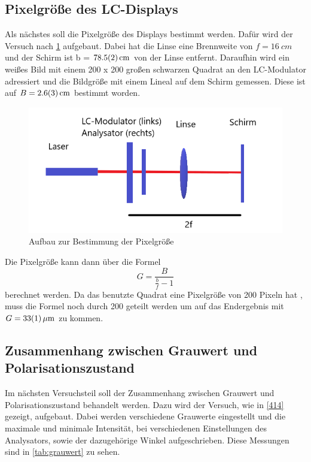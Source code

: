\subsection{Pixelgröße des LC-Displays}
Als nächstes soll die Pixelgröße des Displays bestimmt werden. Dafür wird der Versuch nach \cref{413} aufgebaut. Dabei hat die Linse eine Brennweite von $f = \SI{16}{cm}$ und der Schirm ist b = $\SI{78,5 \pm 0,2}{cm}$ von der Linse entfernt. Daraufhin wird ein weißes Bild mit einem 200 x 200 großen schwarzen Quadrat an den LC-Modulator adressiert und die Bildgröße mit einem Lineal auf dem Schirm gemessen. Diese ist auf $B = \SI{2,6 \pm 0,3}{cm}$
bestimmt worden.
\begin{figure}[h!]
	\centering
	\includegraphics[scale=1]{4.1.3-Aufbau.png}
	\caption{Aufbau zur Bestimmung der Pixelgröße}
	\label{413}
\end{figure}

Die Pixelgröße kann dann über die Formel
\begin{equation}
	G = \frac{B}{\frac{b}{f} - 1} 
\end{equation}
berechnet werden. Da das benutzte Quadrat eine Pixelgröße von 200 Pixeln hat , muss die Formel noch durch 200 geteilt werden um  auf das Endergebnis mit $G = \SI{33 \pm 1}{\mu m}$ zu kommen. 

\subsection{Zusammenhang zwischen Grauwert und Polarisationszustand}
Im nächsten Versuchsteil soll der Zusammenhang zwischen Grauwert und Polarisationszustand behandelt werden. Dazu wird der Versuch, wie in \cref{414} gezeigt, aufgebaut. Dabei werden verschiedene Grauwerte eingestellt und die maximale und minimale Intensität, bei verschiedenen Einstellungen des Analysators, sowie der dazugehörige Winkel aufgeschrieben. Diese Messungen sind in \cref{tab:grauwert} zu sehen.


